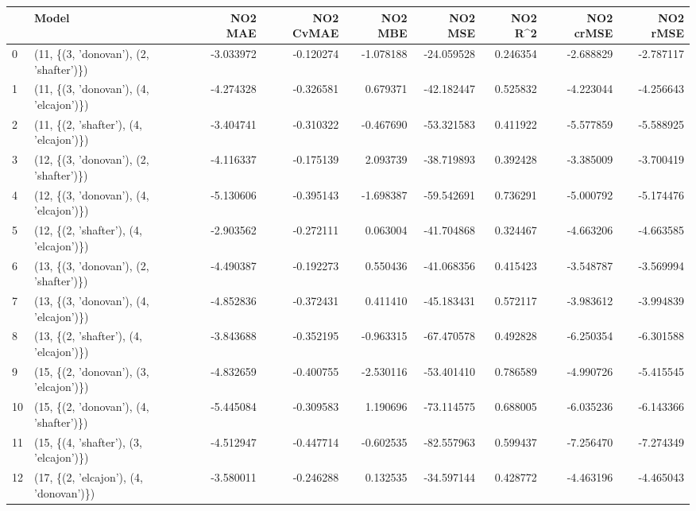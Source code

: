 \begin{tabular}{llrrrrrrr}
\toprule
{} &                                   Model &   NO2 MAE &  NO2 CvMAE &   NO2 MBE &     NO2 MSE &   NO2 R\textasciicircum2 &  NO2 crMSE &   NO2 rMSE \\
\midrule
0  &  (11, \{(3, 'donovan'), (2, 'shafter')\}) & -3.033972 &  -0.120274 & -1.078188 &  -24.059528 &  0.246354 &  -2.688829 &  -2.787117 \\
1  &  (11, \{(3, 'donovan'), (4, 'elcajon')\}) & -4.274328 &  -0.326581 &  0.679371 &  -42.182447 &  0.525832 &  -4.223044 &  -4.256643 \\
2  &  (11, \{(2, 'shafter'), (4, 'elcajon')\}) & -3.404741 &  -0.310322 & -0.467690 &  -53.321583 &  0.411922 &  -5.577859 &  -5.588925 \\
3  &  (12, \{(3, 'donovan'), (2, 'shafter')\}) & -4.116337 &  -0.175139 &  2.093739 &  -38.719893 &  0.392428 &  -3.385009 &  -3.700419 \\
4  &  (12, \{(3, 'donovan'), (4, 'elcajon')\}) & -5.130606 &  -0.395143 & -1.698387 &  -59.542691 &  0.736291 &  -5.000792 &  -5.174476 \\
5  &  (12, \{(2, 'shafter'), (4, 'elcajon')\}) & -2.903562 &  -0.272111 &  0.063004 &  -41.704868 &  0.324467 &  -4.663206 &  -4.663585 \\
6  &  (13, \{(3, 'donovan'), (2, 'shafter')\}) & -4.490387 &  -0.192273 &  0.550436 &  -41.068356 &  0.415423 &  -3.548787 &  -3.569994 \\
7  &  (13, \{(3, 'donovan'), (4, 'elcajon')\}) & -4.852836 &  -0.372431 &  0.411410 &  -45.183431 &  0.572117 &  -3.983612 &  -3.994839 \\
8  &  (13, \{(2, 'shafter'), (4, 'elcajon')\}) & -3.843688 &  -0.352195 & -0.963315 &  -67.470578 &  0.492828 &  -6.250354 &  -6.301588 \\
9  &  (15, \{(2, 'donovan'), (3, 'elcajon')\}) & -4.832659 &  -0.400755 & -2.530116 &  -53.401410 &  0.786589 &  -4.990726 &  -5.415545 \\
10 &  (15, \{(2, 'donovan'), (4, 'shafter')\}) & -5.445084 &  -0.309583 &  1.190696 &  -73.114575 &  0.688005 &  -6.035236 &  -6.143366 \\
11 &  (15, \{(4, 'shafter'), (3, 'elcajon')\}) & -4.512947 &  -0.447714 & -0.602535 &  -82.557963 &  0.599437 &  -7.256470 &  -7.274349 \\
12 &  (17, \{(2, 'elcajon'), (4, 'donovan')\}) & -3.580011 &  -0.246288 &  0.132535 &  -34.597144 &  0.428772 &  -4.463196 &  -4.465043 \\

\end{tabular}
